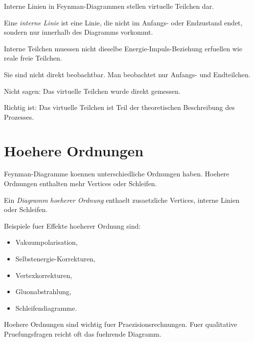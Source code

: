 Interne Linien in Feynman-Diagrammen stellen virtuelle Teilchen dar.

\begin{definitionbox}
Eine \emph{interne Linie} ist eine Linie, die nicht im Anfangs- oder Endzustand
endet, sondern nur innerhalb des Diagramms vorkommt.
\end{definitionbox}

\begin{conceptbox}
Interne Teilchen muessen nicht dieselbe Energie-Impuls-Beziehung erfuellen wie reale
freie Teilchen.

Sie sind nicht direkt beobachtbar.
Man beobachtet nur Anfangs- und Endteilchen.
\end{conceptbox}

\begin{examtipbox}
Nicht sagen:
Das virtuelle Teilchen wurde direkt gemessen.

Richtig ist:
Das virtuelle Teilchen ist Teil der theoretischen Beschreibung des Prozesses.
\end{examtipbox}

\section{Hoehere Ordnungen}

Feynman-Diagramme koennen unterschiedliche Ordnungen haben.
Hoehere Ordnungen enthalten mehr Vertices oder Schleifen.

\begin{definitionbox}
Ein \emph{Diagramm hoeherer Ordnung} enthaelt zusaetzliche Vertices, interne Linien
oder Schleifen.
\end{definitionbox}

\begin{conceptbox}
Beispiele fuer Effekte hoeherer Ordnung sind:
\begin{itemize}
    \item Vakuumpolarisation,
    \item Selbstenergie-Korrekturen,
    \item Vertexkorrekturen,
    \item Gluonabstrahlung,
    \item Schleifendiagramme.
\end{itemize}
\end{conceptbox}

\begin{notebox}
Hoehere Ordnungen sind wichtig fuer Praezisionsrechnungen.
Fuer qualitative Pruefungsfragen reicht oft das fuehrende Diagramm.
\end{notebox}


